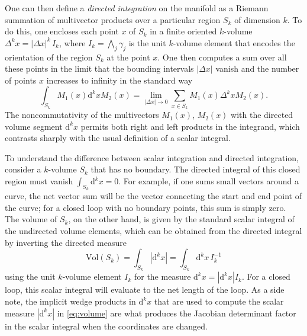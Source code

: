 \documentclass[1p,sort&compress]{elsarticle}
\numberwithin{equation}{section}
\begin{document}
One can then define a \emph{directed integration} on the manifold as a Riemann summation of multivector products over a particular region $S_k$ of dimension $k$.  To do this, one encloses each point $x$ of $S_k$ in a finite oriented $k$-volume $\Delta^k\!x = |\Delta x|^k\,I_k$, where $I_k = \bigwedge_j \gamma_j$ is the unit $k$-volume element that encodes the orientation of the region $S_k$ at the point $x$.  One then computes a sum over all these points in the limit that the bounding intervals $|\Delta x|$ vanish and the number of points $x$ increases to infinity in the standard way \cite{Hestenes1968}
\begin{equation}
  \int_{S_k} M_1(x) \textrm{d}^k\!x M_2(x) = \lim_{|\Delta x|\to 0} \sum_{x\in S_k} M_1(x) \Delta^k\!x M_2(x).
\end{equation}
The noncommutativity of the multivectors $M_1(x)$, $M_2(x)$ with the directed volume segment $\textrm{d}^k\!x$ permits both right and left products in the integrand, which contrasts sharply with the usual definition of a scalar integral.

To understand the difference between scalar integration and directed integration, consider a $k$-volume $S_k$ that has no boundary.  The directed integral of this closed region must vanish $\int_{S_k} \textrm{d}^k\! x = 0$.  For example, if one sums small vectors around a curve, the net vector sum will be the vector connecting the start and end point of the curve; for a closed loop with no boundary points, this sum is simply zero. The volume of $S_k$, on the other hand, is given by the standard scalar integral of the undirected volume elements, which can be obtained from the directed integral by inverting the directed measure
\begin{equation}\label{eq:volume}
  \text{Vol}(S_k) = \int_{S_k} |\textrm{d}^k\!x| = \int_{S_k} \textrm{d}^k\!x \, I^{-1}_k
\end{equation}
using the unit $k$-volume element $I_k$ for the measure $\textrm{d}^k\!x = |\textrm{d}^k\!x|I_k$.  For a closed loop, this scalar integral will evaluate to the net length of the loop.  As a side note, the implicit wedge products in $\textrm{d}^k\!x$ that are used to compute the scalar measure $|\textrm{d}^k\!x|$ in \eqref{eq:volume} are what produces the Jacobian determinant factor in the scalar integral when the coordinates are changed.

\end{document}

